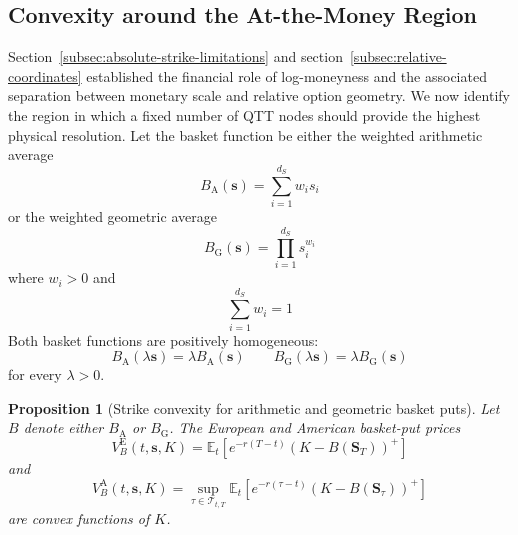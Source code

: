 \documentclass{article}
\numberwithin{equation}{subsection}
\newtheorem{proposition}[theorem]{Proposition}
\theoremstyle{definition}
\theoremstyle{remark}
\begin{document}
\subsection{Convexity around the At-the-Money Region}
Section~\ref{subsec:absolute-strike-limitations} and section~\ref{subsec:relative-coordinates} established the financial role of log-moneyness and the associated separation between monetary scale and relative option geometry. We now identify the region in which a fixed number of QTT nodes should provide the highest physical resolution. Let the basket function be either the weighted arithmetic average
\begin{equation}
B_{\mathrm{A}}(\boldsymbol{s})
=
\sum_{i=1}^{d_S} w_i s_i
\end{equation}
or the weighted geometric average
\begin{equation}
B_{\mathrm{G}}(\boldsymbol{s})
=
\prod_{i=1}^{d_S} s_i^{w_i}
\end{equation}
where \(w_i>0\) and
\begin{equation}
\sum_{i=1}^{d_S}w_i=1
\end{equation}
Both basket functions are positively homogeneous:
\begin{equation}
B_{\mathrm{A}}(\lambda\boldsymbol{s})
=
\lambda B_{\mathrm{A}}(\boldsymbol{s})
\qquad
B_{\mathrm{G}}(\lambda\boldsymbol{s})
=
\lambda B_{\mathrm{G}}(\boldsymbol{s})
\end{equation}
for every \(\lambda>0\).
\begin{proposition}[Strike convexity for arithmetic and geometric basket puts]
Let \(B\) denote either \(B_{\mathrm{A}}\) or \(B_{\mathrm{G}}\). The European and American basket-put prices
\begin{equation}
V_B^{\mathrm{E}}(t,\boldsymbol{s},K)
=
\mathbb{E}_t
\left[
e^{-r(T-t)}
\left(
K-B(\boldsymbol{S}_T)
\right)^+
\right]
\end{equation}
and
\begin{equation}
V_B^{\mathrm{A}}(t,\boldsymbol{s},K)
=
\sup_{\tau\in\mathcal{T}_{t,T}}
\mathbb{E}_t
\left[
e^{-r(\tau-t)}
\left(
K-B(\boldsymbol{S}_\tau)
\right)^+
\right]
\end{equation}
are convex functions of \(K\).
\end{proposition}
\end{document}
